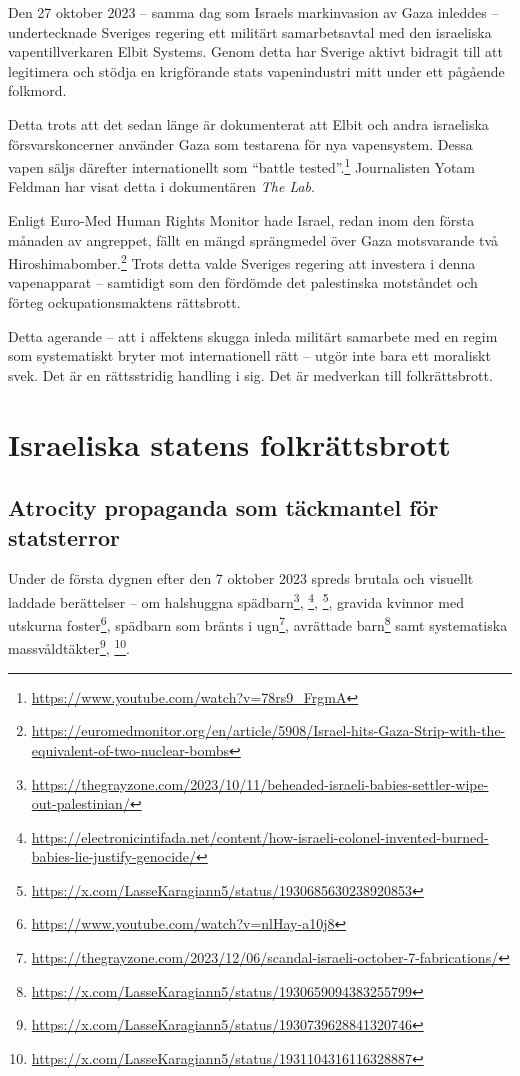 \documentclass[12pt]{article}
\begin{document}
Den 27 oktober 2023 – samma dag som Israels markinvasion av Gaza inleddes – undertecknade Sveriges regering ett militärt samarbetsavtal med den israeliska vapentillverkaren Elbit Systems. Genom detta har Sverige aktivt bidragit till att legitimera och stödja en krigförande stats vapenindustri mitt under ett pågående folkmord.

Detta trots att det sedan länge är dokumenterat att Elbit och andra israeliska försvarskoncerner använder Gaza som testarena för nya vapensystem. Dessa vapen säljs därefter internationellt som “battle tested”.\footnote{\url{https://www.youtube.com/watch?v=78rs9_FrgmA}} Journalisten Yotam Feldman har visat detta i dokumentären \textit{The Lab}.

Enligt Euro-Med Human Rights Monitor hade Israel, redan inom den första månaden av angreppet, fällt en mängd sprängmedel över Gaza motsvarande två Hiroshimabomber.\footnote{\url{https://euromedmonitor.org/en/article/5908/Israel-hits-Gaza-Strip-with-the-equivalent-of-two-nuclear-bombs}} Trots detta valde Sveriges regering att investera i denna vapenapparat – samtidigt som den fördömde det palestinska motståndet och förteg ockupationsmaktens rättsbrott.

Detta agerande – att i affektens skugga inleda militärt samarbete med en regim som systematiskt bryter mot internationell rätt – utgör inte bara ett moraliskt svek. Det är en rättsstridig handling i sig. Det är medverkan till folkrättsbrott.


\section{Israeliska statens folkrättsbrott}

\subsection{Atrocity propaganda som täckmantel för statsterror}

Under de första dygnen efter den 7 oktober 2023 spreds brutala och visuellt laddade berättelser – om halshuggna spädbarn\footnote{\url{https://thegrayzone.com/2023/10/11/beheaded-israeli-babies-settler-wipe-out-palestinian/}}, 
\footnote{\url{https://electronicintifada.net/content/how-israeli-colonel-invented-burned-babies-lie-justify-genocide/}}, 
\footnote{\url{https://x.com/LasseKaragiann5/status/1930685630238920853}}, 
gravida kvinnor med utskurna foster\footnote{\url{https://www.youtube.com/watch?v=nlHay-a10j8}}, 
spädbarn som bränts i ugn\footnote{\url{https://thegrayzone.com/2023/12/06/scandal-israeli-october-7-fabrications/}}, 
avrättade barn\footnote{\url{https://x.com/LasseKaragiann5/status/1930659094383255799}} samt 
systematiska massvåldtäkter\footnote{\url{https://x.com/LasseKaragiann5/status/1930739628841320746}}, 
\footnote{\url{https://x.com/LasseKaragiann5/status/1931104316116328887}}.
\end{document}
